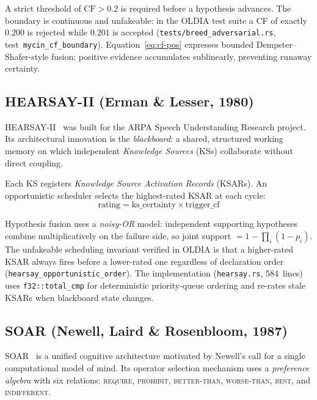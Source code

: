 A strict threshold of $\mathrm{CF} > 0.2$ is required before a hypothesis
advances.  The boundary is continuous and unfakeable: in the OLDIA test suite
a CF of exactly $0.200$ is rejected while $0.201$ is accepted
(\texttt{tests/breed\_adversarial.rs}, test~\texttt{mycin\_cf\_boundary}).
Equation~\ref{eq:cf-pos} expresses bounded Dempster--Shafer-style fusion:
positive evidence accumulates sublinearly, preventing runaway certainty.

\subsection{HEARSAY-II (Erman \& Lesser, 1980)}
\label{subsec:hearsay}

HEARSAY-II~\cite{erman1980} was built for the ARPA Speech Understanding
Research project.  Its architectural innovation is the \emph{blackboard}:
a shared, structured working memory on which independent \emph{Knowledge
Sources} (KSs) collaborate without direct coupling.

Each KS registers \emph{Knowledge Source Activation Records} (KSARs).  An
opportunistic scheduler selects the highest-rated KSAR at each cycle:
\begin{equation}
  \mathrm{rating} = \mathrm{ks\_certainty} \times \mathrm{trigger\_cf}
  \label{eq:ksar-rating}
\end{equation}

Hypothesis fusion uses a \emph{noisy-OR} model: independent supporting
hypotheses combine multiplicatively on the failure side, so joint support
$= 1 - \prod_i (1 - p_i)$.  The unfakeable scheduling invariant verified in
OLDIA is that a higher-rated KSAR always fires before a lower-rated one
regardless of declaration order (\texttt{hearsay\_opportunistic\_order}).
The implementation (\texttt{hearsay.rs}, 584~lines) uses
\texttt{f32::total\_cmp} for deterministic priority-queue ordering and
re-rates stale KSARs when blackboard state changes.

\subsection{SOAR (Newell, Laird \& Rosenbloom, 1987)}
\label{subsec:soar}

SOAR~\cite{laird1987} is a unified cognitive architecture motivated by
Newell's call for a single computational model of mind.  Its operator
selection mechanism uses a \emph{preference algebra} with six relations:
\textsc{require}, \textsc{prohibit}, \textsc{better-than},
\textsc{worse-than}, \textsc{best}, and \textsc{indifferent}.

